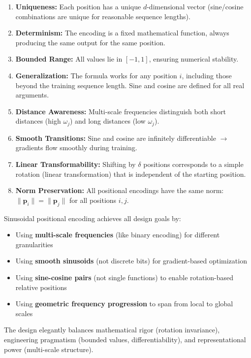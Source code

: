 \documentclass{article}
\begin{document}
\begin{enumerate}
\item \textbf{Uniqueness:} Each position has a unique $d$-dimensional vector (sine/cosine combinations are unique for reasonable sequence lengths).

\item \textbf{Determinism:} The encoding is a fixed mathematical function, always producing the same output for the same position.

\item \textbf{Bounded Range:} All values lie in $[-1, 1]$, ensuring numerical stability.

\item \textbf{Generalization:} The formula works for any position $i$, including those beyond the training sequence length. Sine and cosine are defined for all real arguments.

\item \textbf{Distance Awareness:} Multi-scale frequencies distinguish both short distances (high $\omega_j$) and long distances (low $\omega_j$).

\item \textbf{Smooth Transitions:} Sine and cosine are infinitely differentiable $\rightarrow$ gradients flow smoothly during training.

\item \textbf{Linear Transformability:} Shifting by $\delta$ positions corresponds to a simple rotation (linear transformation) that is independent of the starting position.

\item \textbf{Norm Preservation:} All positional encodings have the same norm: $\|\mathbf{p}_i\| = \|\mathbf{p}_j\|$ for all positions $i, j$.
\end{enumerate}

\begin{tcolorbox}[colback=green!5!white, colframe=green!50!black, title=The Elegant Solution]
Sinusoidal positional encoding achieves all design goals by:
\begin{itemize}
\item Using \textbf{multi-scale frequencies} (like binary encoding) for different granularities
\item Using \textbf{smooth sinusoids} (not discrete bits) for gradient-based optimization
\item Using \textbf{sine-cosine pairs} (not single functions) to enable rotation-based relative positions
\item Using \textbf{geometric frequency progression} to span from local to global scales
\end{itemize}

The design elegantly balances mathematical rigor (rotation invariance), engineering pragmatism (bounded values, differentiability), and representational power (multi-scale structure).
\end{tcolorbox}
\end{document}
